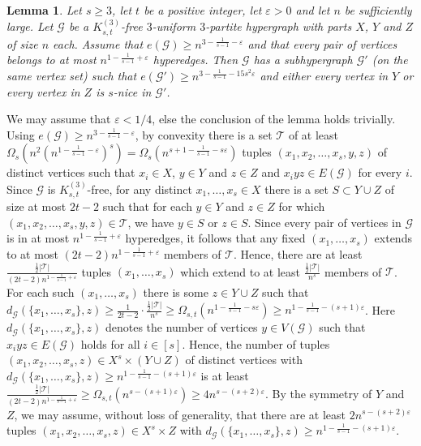 \documentclass[a4paper,11pt]{article}
\makeatletter
\renewenvironment{proof}[1][\proofname] {\par\pushQED{\qed}\normalfont\topsep6\p@\@plus6\p@\relax\trivlist\item[\hskip\labelsep\bfseries#1\@addpunct{.}]\ignorespaces}{\popQED\endtrivlist\@endpefalse}
\newtheorem{lemma}[theorem]{\bf Lemma}
\theoremstyle{definition}
\def\eps{\varepsilon}
\def\cG{\mathcal{G}}
\makeatother
\begin{document}
\begin{lemma} \label{lem:one part nice}
   Let $s\geq 3$, let $t$ be a positive integer, let $\eps>0$ and let $n$ be sufficiently large. Let $\cG$ be a $K_{s,t}^{(3)}$-free $3$-uniform $3$-partite hypergraph with parts $X$, $Y$ and $Z$ of size $n$ each. Assume that $e(\cG)\geq n^{3-\frac{1}{s-1}-\eps}$ and that every pair of vertices belongs to at most $n^{1-\frac{1}{s-1}+\eps}$ hyperedges. Then $\cG$ has a subhypergraph $\cG'$ (on the same vertex set) such that $e(\cG')\geq n^{3-\frac{1}{s-1}-15s^2\eps}$ and either every vertex in $Y$ or every vertex in $Z$ is $s$-nice in $\cG'$.
\end{lemma}

\begin{proof}
    We may assume that $\eps<1/4$, else the conclusion of the lemma holds trivially. Using $e(\cG)\geq n^{3-\frac{1}{s-1}-\eps}$, by convexity there is a set $\mathcal{T}$ of at least $\Omega_s(n^2(n^{1-\frac{1}{s-1}-\eps})^s) = \Omega_s(n^{s+1-\frac{1}{s-1}-s\varepsilon})$ tuples $(x_1,x_2,\dots,x_s,y,z)$ of distinct vertices such that $x_i\in X$, $y\in Y$ and $z\in Z$ and $x_iyz\in E(\cG)$ for every $i$. Since $\cG$ is $K_{s,t}^{(3)}$-free, for any distinct $x_1,\dots,x_s\in X$ there is a set $S\subset Y\cup Z$ of size at most $2t-2$ such that for each $y\in Y$ and $z\in Z$ for which $(x_1,x_2,\dots,x_s,y,z)\in \mathcal{T}$, we have $y\in S$ or $z\in S$. Since every pair of vertices in $\cG$ is in at most $n^{1-\frac{1}{s-1}+\eps}$ hyperedges, it follows that any fixed $(x_1,\dots,x_s)$ extends to at most $(2t-2)n^{1-\frac{1}{s-1}+\eps}$ members of $\mathcal{T}$. Hence, there are at least $\frac{\frac{1}{2}|\mathcal{T}|}{(2t-2)n^{1-\frac{1}{s-1}+\eps}}$ tuples $(x_1,\dots,x_s)$ which extend to at least $\frac{\frac{1}{2}|\mathcal{T}|}{n^s}$ members of $\mathcal{T}$. For each such $(x_1,\dots,x_s)$ there is some $z\in Y\cup Z$ such that $d_{\cG}(\{x_1,\dots,x_s\},z)\geq
    \frac{1}{2t-2} \cdot \frac{\frac{1}{2}|\mathcal{T}|}{n^s} \geq \Omega_{s,t}(n^{1 - \frac{1}{s-1}-s\varepsilon}) \geq
    n^{1-\frac{1}{s-1}-(s+1)\eps}$. Here $d_{\cG}(\{x_1,\dots,x_s\},z)$ denotes the number of vertices $y\in V(\cG)$ such that $x_iyz\in E(\cG)$ holds for all $i\in [s]$. Hence, the number of tuples $(x_1,x_2,\dots,x_s,z)\in X^s\times (Y\cup Z)$ of distinct vertices with $d_{\cG}(\{x_1,\dots,x_s\},z)\geq n^{1-\frac{1}{s-1}-(s+1)\eps}$ is at least $\frac{\frac{1}{2}|\mathcal{T}|}{(2t-2)n^{1-\frac{1}{s-1}+\eps}}\geq \Omega_{s,t}(n^{s-(s+1)\eps})\geq 4n^{s-(s+2)\eps}$. By the symmetry of $Y$ and $Z$, we may assume, without loss of generality, that there are at least $2n^{s-(s+2)\eps}$ tuples $(x_1,x_2,\dots,x_s,z)\in X^s\times Z$ with $d_{\cG}(\{x_1,\dots,x_s\},z)\geq n^{1-\frac{1}{s-1}-(s+1)\eps}$.
    

\end{proof}
\end{document}
